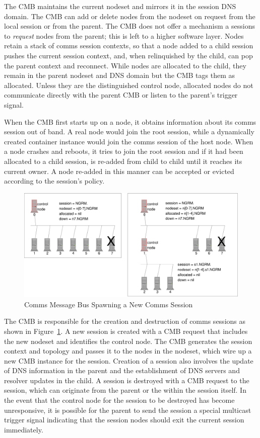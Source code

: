The CMB maintains the current nodeset and mirrors it in the session DNS
domain.  The CMB can add or delete nodes from the nodeset on request
from the local session or from the parent.  The CMB does not offer a
mechanism a sessions to {\em request} nodes from the parent; this
is left to a higher software layer.  Nodes retain a stack of comms
session contexts, so that a node added to a child session pushes the current
session context, and, when relinquished by the child, can pop the parent
context and reconnect.
While nodes are allocated to the child, they remain in the parent nodeset
and DNS domain but the CMB tags them as allocated.  Unless they are the
distinguished control node, allocated nodes do not communicate directly with
the parent CMB or listen to the parent's trigger signal.

When the CMB first starts up on a node, it obtains information about its
comms session out of band.
A real node would join the root session, while a dynamically created
container instance would join the comms session of the host node.
When a node crashes and reboots, it tries to join the root session and if
it had been allocated to a child session, is re-added from child to
child until it reaches its current owner.  A node re-added in this manner
can be accepted or evicted according to the session's policy.

\begin{figure}
\centering
\includegraphics[scale=0.50]{../fig/cmb.eps}
\caption{Comms Message Bus Spawning a New Comms Session}
\label{FigCMBSpawn}
\end{figure}

The CMB is responsible for the creation and destruction of
comms sessions as shown in Figure~\ref{FigCMBSpawn}.
A new session is created with a CMB request that
includes the new nodeset and identifies the control node.  The CMB
generates the session context and topology and passes it to the nodes
in the nodeset, which wire up a new CMB instance for the session.
Creation of a session also involves the update of DNS information
in the parent and the establishment of DNS servers and resolver updates
in the child. 
A session is destroyed with a CMB request to the session,
which can originate from the parent or the within the session itself.
In the event that the control node for the session to be destroyed has become
unresponsive, it is possible for the parent to send the session a
special multicast trigger signal indicating that the session nodes
should exit the current session immediately.


